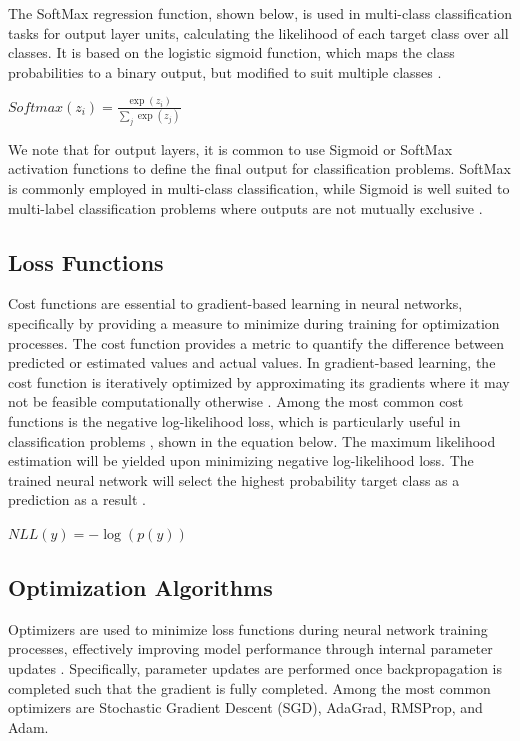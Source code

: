 \documentclass{article}
\begin{document}
The SoftMax regression function, shown below, is used in multi-class classification tasks for output layer units, calculating the likelihood of each target class over all classes.  It is based on the logistic sigmoid function, which maps the class probabilities to a binary output, but modified to suit multiple classes \cite{unsupervised}.
\newline
\newline
\centerline{${Softmax}(z_{i}) = \frac{\exp(z_i)}{\sum_j \exp(z_j)}$}
\newline
\newline


We note that for output layers, it is common to use Sigmoid or SoftMax activation functions to define the final output for classification problems. SoftMax is commonly employed in multi-class classification, while Sigmoid is well suited to multi-label classification problems where outputs are not mutually exclusive \cite{draelos_2019}.

\subsection{Loss Functions}
Cost functions are essential to gradient-based learning in neural networks, specifically by providing a measure to minimize during training for optimization processes. The cost function provides a metric to quantify the difference between predicted or estimated values and actual values. In gradient-based learning, the cost function is iteratively optimized by approximating its gradients where it may not be feasible computationally otherwise \cite{Goodfellow-et-al-2016}. Among the most common cost functions is the negative log-likelihood loss, which is particularly useful in classification problems \cite{NEURIPS2019_9015,nllloss}, shown in the equation below. The maximum likelihood estimation will be yielded upon minimizing negative log-likelihood loss. The trained neural network will select the highest probability target class as a prediction as a result \cite{Goodfellow-et-al-2016}.
\newline
\newline
\centerline{$NLL(y) = -{\log(p(y))}$}
\newline



\subsection{Optimization Algorithms}
Optimizers are used to minimize loss functions during neural network training processes, effectively improving model performance through internal parameter updates \cite{8862686}. Specifically, parameter updates are performed once backpropagation is completed such that the gradient is fully completed. Among the most common optimizers are Stochastic Gradient Descent (SGD), AdaGrad, RMSProp, and Adam.  
\end{document}
